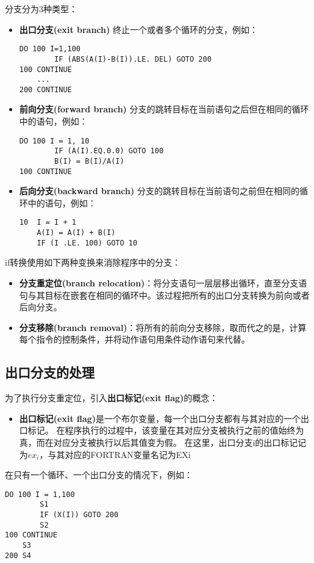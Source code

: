 分支分为3种类型：
\begin{itemize}
\item \textbf{出口分支(exit branch)}
终止一个或者多个循环的分支，例如：
\begin{lstlisting}[language=FORTRAN]
	DO 100 I=1,100
		IF (ABS(A(I)-B(I)).LE. DEL) GOTO 200
100	CONTINUE
	...
200 CONTINUE
\end{lstlisting}
\item \textbf{前向分支(forward branch)}
分支的跳转目标在当前语句之后但在相同的循环中的语句，例如：
\begin{lstlisting}[language=FORTRAN]
	DO 100 I = 1, 10
		IF (A(I).EQ.0.0) GOTO 100
		B(I) = B(I)/A(I)
100	CONTINUE
\end{lstlisting}
\item \textbf{后向分支(backward branch)}
分支的跳转目标在当前语句之前但在相同的循环中的语句，例如：
\begin{lstlisting}[language=FORTRAN]
10	I = I + 1
	A(I) = A(I) + B(I)
	IF (I .LE. 100) GOTO 10
\end{lstlisting}
\end{itemize}

if转换使用如下两种变换来消除程序中的分支：

\begin{itemize}
\item \textbf{分支重定位(branch relocation)}：将分支语句一层层移出循环，直至分支语句与其目标在嵌套在相同的循环中。该过程把所有的出口分支转换为前向或者后向分支。
\item \textbf{分支移除(branch removal)}：将所有的前向分支移除，取而代之的是，计算每个指令的控制条件，并将动作语句用条件动作语句来代替。
\end{itemize}

\subsection{出口分支的处理}

为了执行分支重定位，引入\textbf{出口标记(exit flag)}的概念：
\begin{itemize}
\item \textbf{出口标记(exit flag)}是一个布尔变量，每一个出口分支都有与其对应的一个出口标记。
在程序执行的过程中，该变量在其对应分支被执行之前的值始终为真，而在对应分支被执行以后其值变为假。
在这里，出口分支i的出口标记记为$ex_i$，与其对应的FORTRAN变量名记为EXi
\end{itemize}

在只有一个循环、一个出口分支的情况下，例如：
\begin{lstlisting}[language=FORTRAN]
	DO 100 I = 1,100
		S1
		IF (X(I)) GOTO 200
		S2
100	CONTINUE
	S3
200 S4
\end{lstlisting}

